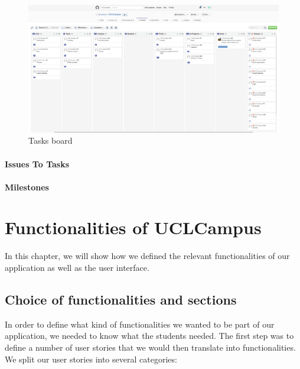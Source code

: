 \documentclass[11pt, a4paper]{report}
\begin{document}
\begin{figure}
\centering
\includegraphics[scale = 0.5, angle = 90]{Images/dashboard.png}
\caption{Tasks board}
\end{figure}

\subsubsection{Issues To Tasks}



\subsubsection{Milestones}


\chapter{Functionalities of UCLCampus}

In this chapter, we will show how we defined the relevant functionalities of our application as well as the user interface.

\section{Choice of functionalities and sections}


In order to define what kind of functionalities we wanted to be part of our application, we needed to know what the students needed. The first step was to define a number of user stories that we would then translate into functionalities.\\ 
We split our user stories into several categories:
\end{document}
